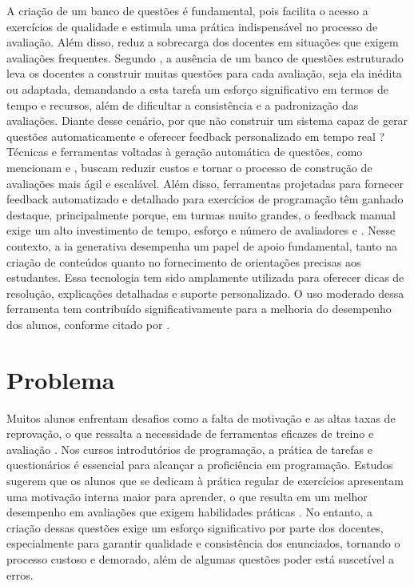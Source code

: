 A criação de um banco de questões é fundamental, pois facilita o acesso a exercícios de qualidade e estimula uma prática indispensável no processo de avaliação. Além disso, reduz a sobrecarga dos docentes em situações que exigem avaliações frequentes. Segundo \parencite{Puthiaparampil2020}, a ausência de um banco de questões estruturado leva os docentes a construir muitas questões  para cada avaliação, seja ela inédita ou adaptada,  demandando a esta tarefa um esforço significativo em termos de tempo e recursos, além de dificultar a consistência e a padronização das avaliações.
Diante desse cenário, por que não construir um sistema capaz de gerar questões automaticamente e oferecer feedback personalizado em tempo real ? Técnicas e ferramentas voltadas à geração automática de questões, como mencionam \parencite{kurdi2020} e \parencite{sewunetie2022}, buscam reduzir custos e tornar o processo de construção de avaliações mais ágil e escalável. Além disso, ferramentas projetadas para fornecer feedback automatizado e detalhado para exercícios de programação têm ganhado destaque, principalmente porque, em turmas muito grandes, o feedback manual exige um alto investimento de tempo, esforço e número de avaliadores \parencite{vanpraet2024} e \parencite{fung2024}.
Nesse contexto, a \gls{ia} generativa desempenha um papel de apoio fundamental, tanto na criação de conteúdos quanto no fornecimento de orientações precisas aos estudantes. Essa tecnologia tem sido amplamente utilizada para oferecer dicas de resolução, explicações detalhadas e suporte personalizado. O uso moderado dessa ferramenta tem contribuído significativamente para a melhoria do desempenho dos alunos, conforme citado por \parencite{yang2024}.

\section{Problema}
Muitos alunos enfrentam desafios como a falta de motivação e as altas taxas de reprovação, o que ressalta a necessidade de ferramentas eficazes de treino e avaliação \parencite{mbiada2022}. Nos cursos introdutórios de programação, a prática de  tarefas e questionários é essencial para alcançar a proficiência em programação. Estudos sugerem que os alunos que se dedicam à prática regular de exercícios apresentam uma motivação interna maior para aprender, o que resulta em um melhor desempenho em avaliações que exigem habilidades práticas \parencite{Edwards2019}. No entanto, a criação dessas questões exige um esforço significativo por parte dos docentes, especialmente para garantir qualidade e consistência dos enunciados, tornando o processo custoso e demorado, além de algumas questões poder está suscetível a erros. 

